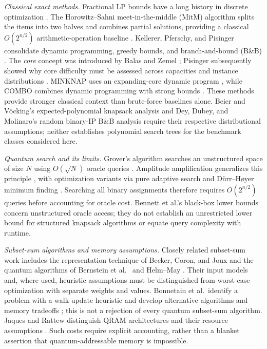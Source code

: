 \documentclass[conference]{IEEEtran}
\begin{document}
\textit{Classical exact methods.} Fractional LP bounds have a long history in discrete optimization \cite{ref1}. The Horowitz--Sahni meet-in-the-middle (MitM) algorithm splits the items into two halves and combines partial solutions, providing a classical $O(2^{n/2})$ arithmetic-operation baseline \cite{ref2}. Kellerer, Pferschy, and Pisinger consolidate dynamic programming, greedy bounds, and branch-and-bound (B\&B) \cite{ref3}. The \emph{core} concept was introduced by Balas and Zemel \cite{balas1980core}; Pisinger subsequently showed why core difficulty must be assessed across capacities and instance distributions \cite{ref4}. MINKNAP uses an expanding-core dynamic program \cite{pisinger1997minimal}, while COMBO combines dynamic programming with strong bounds \cite{martello1999combo}. These methods provide stronger classical context than brute-force baselines alone. Beier and V\"ocking's expected-polynomial knapsack analysis \cite{beier2004random} and Dey, Dubey, and Molinaro's random binary-IP B\&B analysis \cite{dey2021random} require their respective distributional assumptions; neither establishes polynomial search trees for the benchmark classes considered here.

\textit{Quantum search and its limits.} Grover's algorithm searches an unstructured space of size $N$ using $O(\sqrt{N})$ oracle queries \cite{ref8}. Amplitude amplification generalizes this principle \cite{ref11}, with optimization variants via pure adaptive search \cite{ref12} and D\"urr--H{\o}yer minimum finding \cite{ref13}. Searching all binary assignments therefore requires $O(2^{n/2})$ queries before accounting for oracle cost. Bennett et al.'s black-box lower bounds \cite{ref9} concern unstructured oracle access; they do not establish an unrestricted lower bound for structured knapsack algorithms or equate query complexity with runtime.

\textit{Subset-sum algorithms and memory assumptions.} Closely related subset-sum work includes the representation technique of Becker, Coron, and Joux \cite{ref5} and the quantum algorithms of Bernstein et al.\ \cite{ref16} and Helm--May \cite{ref17}. Their input models and, where used, heuristic assumptions must be distinguished from worst-case optimization with separate weights and values. Bonnetain et al.\ identify a problem with a walk-update heuristic and develop alternative algorithms and memory tradeoffs \cite{bonnetain2020improved}; this is not a rejection of every quantum subset-sum algorithm. Jaques and Rattew distinguish QRAM architectures and their resource assumptions \cite{ref18}. Such costs require explicit accounting, rather than a blanket assertion that quantum-addressable memory is impossible.
\end{document}
